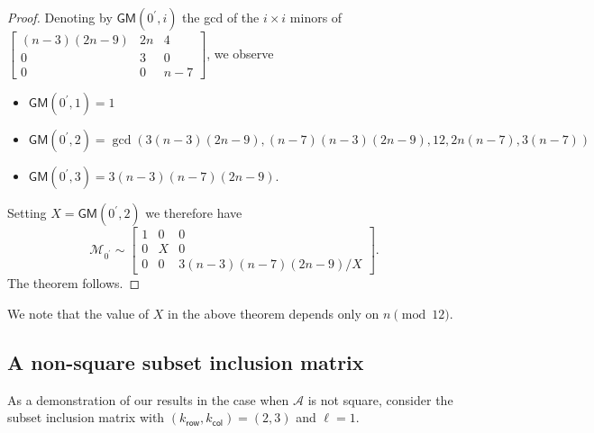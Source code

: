 \documentclass[11pt]{article}
\theoremstyle{definition}
\numberwithin{equation}{section}
\numberwithin{equation}{section}
\newcommand{\M}{\mathcal{M}}
\newcommand{\A}{\mathcal{A}}
\newcommand{\GM}{\mathsf{GM}}
\newcommand{\kr}{{k}_{\mathsf{row}}}
\newcommand{\kc}{{k}_{\mathsf{col}}}
\begin{document}
\begin{proof}
Denoting by $\GM(0^{\prime},i)$ the gcd of the $i \times i$ minors of $\begin{bmatrix}
   (n-3)(2n-9) & 2n& 4\\
    0& 3& 0\\
    0& 0& n-7
\end{bmatrix}$, we observe
\begin{itemize}
    \item $\GM(0^{\prime}, 1) = 1$
    \item $\GM(0^{\prime}, 2) = \gcd(3(n-3)(2n-9), (n-7)(n-3)(2n-9), 12, 2n(n-7), 3(n-7))$
    \item $\GM(0^{\prime}, 3) = 3(n-3)(n-7)(2n-9)$.
\end{itemize}
Setting $X = \GM(0^{\prime}, 2)$ we therefore have
\[
\M_{0^{\prime}} \sim \begin{bmatrix}
   1 & 0& 0\\
    0& X& 0\\
    0& 0& 3(n-3)(n-7)(2n-9)/X
\end{bmatrix}.
\]
The theorem follows.  
\end{proof}
We note that the value of $X$ in the above theorem depends only on $n \pmod{12}$.


\subsection{A non-square subset inclusion matrix}

As a demonstration of our results in the case when $\A$ is not square, consider the subset inclusion matrix with $(\kr,\kc) = (2, 3)$ and $\ell = 1$.
\end{document}
